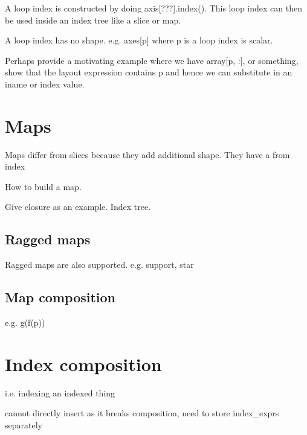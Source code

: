 \documentclass[thesis]{subfiles}
\begin{document}
A loop index is constructed by doing axis[???].index().
This loop index can then be used inside an index tree like a slice or map.

A loop index has no shape. e.g. axes[p] where p is a loop index is scalar.

Perhaps provide a motivating example where we have array[p, :], or something, show that the layout expression contains p and hence we can substitute in an iname or index value.

\section{Maps}

Maps differ from slices because they add additional shape. They have a from index

How to build a map.

Give closure as an example. Index tree.

\subsection{Ragged maps}

Ragged maps are also supported. e.g. support, star

\subsection{Map composition}

e.g. g(f(p))

\section{Index composition}

i.e. indexing an indexed thing


cannot directly insert as it breaks composition, need to store index\_exprs separately
\end{document}
